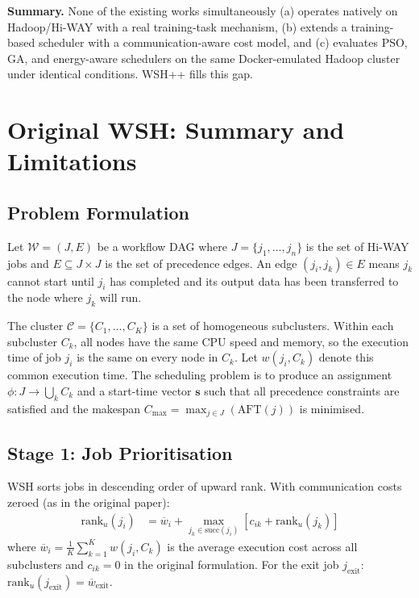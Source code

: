 \documentclass[10pt,twocolumn]{article}
\begin{document}
\noindent\textbf{Summary.} None of the existing works simultaneously (a) operates
natively on Hadoop/Hi-WAY with a real training-task mechanism, (b) extends a
training-based scheduler with a communication-aware cost model, and (c) evaluates
PSO, GA, and energy-aware schedulers on the same Docker-emulated Hadoop cluster
under identical conditions. WSH++ fills this gap.

\section{Original WSH: Summary and Limitations}
\label{sec:wsh_original}

\subsection{Problem Formulation}

Let $\mathcal{W} = (J, E)$ be a workflow DAG where $J = \{j_1, \ldots, j_n\}$ is
the set of Hi-WAY jobs and $E \subseteq J \times J$ is the set of precedence edges.
An edge $(j_i, j_k) \in E$ means $j_k$ cannot start until $j_i$ has completed and
its output data has been transferred to the node where $j_k$ will run.

The cluster $\mathcal{C} = \{C_1, \ldots, C_K\}$ is a set of homogeneous
subclusters. Within each subcluster $C_k$, all nodes have the same CPU speed and
memory, so the execution time of job $j_i$ is the same on every node in $C_k$.
Let $w(j_i, C_k)$ denote this common execution time. The scheduling problem is to
produce an assignment $\phi : J \rightarrow \bigcup_k C_k$ and a start-time vector
$\mathbf{s}$ such that all precedence constraints are satisfied and the makespan
$C_{\max} = \max_{j \in J} (\text{AFT}(j))$ is minimised.

\subsection{Stage 1: Job Prioritisation}

WSH sorts jobs in descending order of upward rank. With communication costs zeroed
(as in the original paper):
\begin{align}
    \text{rank}_u(j_i) &= \overline{w}_i + \max_{j_k \in \text{succ}(j_i)}
    \left[c_{ik} + \text{rank}_u(j_k)\right]
    \label{eq:orig_rank}
\end{align}
where $\overline{w}_i = \frac{1}{K}\sum_{k=1}^{K} w(j_i, C_k)$ is the average
execution cost across all subclusters and $c_{ik} = 0$ in the original formulation.
For the exit job $j_{\text{exit}}$:
$\text{rank}_u(j_{\text{exit}}) = \overline{w}_{\text{exit}}$.
\end{document}
